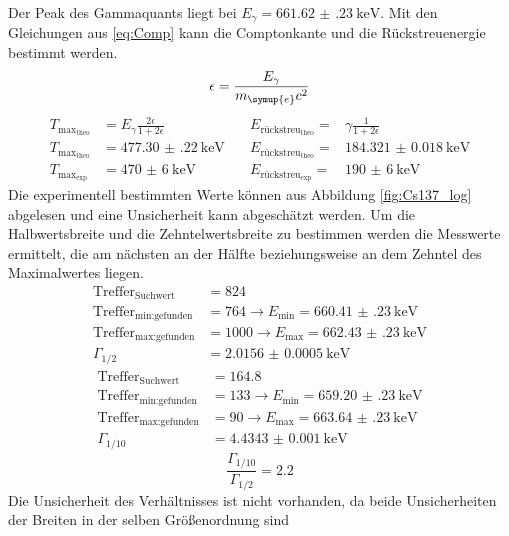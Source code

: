 \FloatBarrier
Der Peak des Gammaquants liegt bei $E_{\gamma}=\SI{661.62(23)}{\kilo\eV}$. Mit den Gleichungen aus \eqref{eq:Comp} kann 
die Comptonkante und die Rückstreuenergie bestimmt werden.
\begin{equation*}
  \epsilon = \frac{E_{\gamma}}{m_{\symup{e}}c^2}
\end{equation*}
\begin{align}
  T_{\text{max}_{\text{theo}}} &= E_{\gamma}\frac{2\epsilon}{1+2\epsilon} \quad &E_{\text{rückstreu}_{\text{theo}}} =&{\gamma}\frac{1}{1+2\epsilon} \label{eq:Comp}\\
  T_{\text{max}_{\text{theo}}} &= \SI{477.30(22)}{\kilo\eV} \quad &E_{\text{rückstreu}_{\text{theo}}} =& \SI{184.321(18)}{\kilo\eV}\\
  T_{\text{max}_{\text{exp}}} &= \SI{470(6)}{\kilo\eV} \quad & E_{\text{rückstreu}_{\text{exp}}} =& \SI{190(6)}{\kilo\eV}
\end{align}
Die experimentell bestimmten Werte können aus Abbildung \ref{fig:Cs137_log} abgelesen und eine Unsicherheit 
kann abgeschätzt werden.
Um die Halbwertsbreite und die Zehntelwertsbreite zu bestimmen werden die Messwerte ermittelt, die am nächsten an der 
Hälfte beziehungsweise an dem Zehntel des Maximalwertes liegen.
\begin{align*}
  \text{Treffer}_{\text{Suchwert}}&=824\\
  \text{Treffer}_{\text{min:gefunden}} &= 764 \rightarrow E_{\text{min}} = \SI{660.41(23)}{\kilo\eV}\\
  \text{Treffer}_\text{{max:gefunden}} &= 1000 \rightarrow E_{\text{max}} = \SI{662.43(23)}{\kilo\eV}\\
  \Gamma_{1/2} &= \SI{2.0156(5)}{\kilo\eV}
\end{align*}
\begin{align*}
  \text{Treffer}_{\text{Suchwert}}&=\num{164.8}\\
  \text{Treffer}_{\text{min:gefunden}} &= 133 \rightarrow E_{\text{min}} = \SI{659.20(23)}{\kilo\eV}\\
  \text{Treffer}_{\text{max:gefunden}} &= 90  \rightarrow E_{\text{max}} = \SI{663.64(23)}{\kilo\eV}\\
  \Gamma_{1/10} &= \SI{4.4343(10)}{\kilo\eV}
\end{align*}
\begin{equation*}
  \frac{\Gamma_{1/10}}{\Gamma_{1/2}}=\num{2.2}
\end{equation*}
Die Unsicherheit des Verhältnisses ist nicht vorhanden, da beide Unsicherheiten der Breiten in der selben Größenordnung sind 
